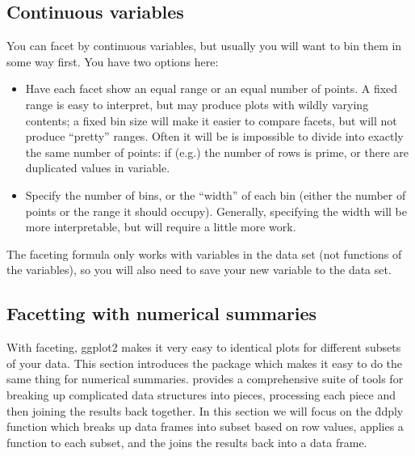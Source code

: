 \subsection{Continuous variables}\label{sub:continuous_variables}

You can facet by continuous variables, but usually you will want to bin them in some way first.  You have two options here:

\begin{itemize}
  \item Have each facet show an equal range or an equal number of points.  A fixed range is easy to interpret, but may produce plots with wildly varying contents; a fixed bin size will make it easier to compare facets, but will not produce ``pretty'' ranges.  Often it will be is impossible to divide into exactly the same number of points: if (e.g.) the number of rows is prime, or there are duplicated values in variable.
    
  \item Specify the number of bins, or the ``width'' of each bin (either the number of points or the range it should occupy).  Generally, specifying the width will be more interpretable, but will require a little more work.
  
\end{itemize}

The faceting formula only works with variables in the data set (not functions of the variables), so you will also need to save your new variable to the data set.

% 
% 
% 
% 


\subsection{Facetting with numerical summaries}
\label{sub:plyr}

With faceting, ggplot2 makes it very easy to identical plots for different subsets of your data.  This section introduces the  package which makes it easy to do the same thing for numerical summaries.   provides a comprehensive suite of tools for breaking up complicated data structures into pieces, processing each piece and then joining the results back together.  In this section we will focus on the \f{ddply} function which breaks up data frames into subset based on row values, applies a function to each subset, and the joins the results back into a data frame.

